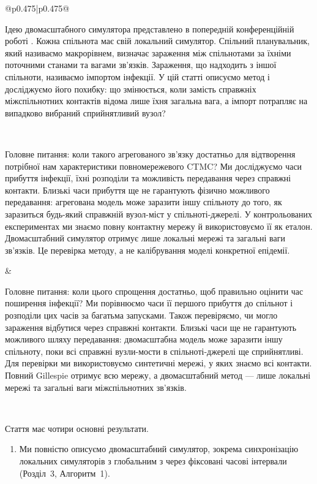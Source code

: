 ﻿\documentclass[11pt]{article}
\begin{document}
\begin{longtable}{@{}p{0.475\textwidth}|p{0.475\textwidth}@{}}
\begin{minipage}[t]{\linewidth}
Ідею двомасштабного симулятора представлено в попередній конференційній роботі \citep{kuryliak2025towards}. Кожна спільнота має свій локальний симулятор. Спільний планувальник, який називаємо макрорівнем, визначає зараження між спільнотами за їхніми поточними станами та вагами зв'язків. Зараження, що надходить з іншої спільноти, називаємо імпортом інфекції. У цій статті описуємо метод і досліджуємо його похибку: що змінюється, коли замість справжніх міжспільнотних контактів відома лише їхня загальна вага, а імпорт потрапляє на випадково вибраний сприйнятливий вузол?
\end{minipage} \\[5mm]
\begin{minipage}[t]{\linewidth}
Головне питання: коли такого агрегованого зв'язку достатньо для відтворення потрібної нам характеристики повномережевого CTMC? Ми досліджуємо часи прибуття інфекції, їхні розподіли та можливість передавання через справжні контакти. Близькі часи прибуття ще не гарантують фізично можливого передавання: агрегована модель може заразити іншу спільноту до того, як заразиться будь-який справжній вузол-міст у спільноті-джерелі. У контрольованих експериментах ми знаємо повну контактну мережу й використовуємо її як еталон. Двомасштабний симулятор отримує лише локальні мережі та загальні ваги зв'язків. Це перевірка методу, а не калібрування моделі конкретної епідемії.
\end{minipage} &
\begin{minipage}[t]{\linewidth}
Головне питання: коли цього спрощення достатньо, щоб правильно оцінити час поширення інфекції? Ми порівнюємо часи її першого прибуття до спільнот і розподіли цих часів за багатьма запусками. Також перевіряємо, чи могло зараження відбутися через справжні контакти. Близькі часи ще не гарантують можливого шляху передавання: двомасштабна модель може заразити іншу спільноту, поки всі справжні вузли-мости в спільноті-джерелі ще сприйнятливі. Для перевірки ми використовуємо синтетичні мережі, у яких знаємо всі контакти. Повний Gillespie отримує всю мережу, а двомасштабний метод --- лише локальні мережі та загальні ваги міжспільнотних зв'язків.
\end{minipage} \\[5mm]
\begin{minipage}[t]{\linewidth}
Стаття має чотири основні результати.
\begin{enumerate}
\item Ми повністю описуємо двомасштабний симулятор, зокрема синхронізацію локальних симуляторів з глобальним з через фіксовані часові інтервали (Розділ~3, Алгоритм~1).

\end{enumerate}
\end{minipage}
\end{longtable}
\end{document}
